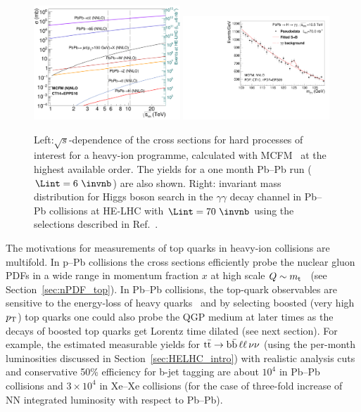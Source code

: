 \documentclass[../report.tex]{subfiles}
\begin{document}
\begin{figure}[!h]
\begin{center}
\includegraphics[width=0.49\textwidth]{helhc/figs/sigma_PbPb_pQCD_vs_sqrts.pdf}
\hfill
\includegraphics[width=0.49\textwidth]{helhc/figs/dsigmadm_Hgg_SplusB_PbPb_10500GeV_lumi70_0invpb.pdf}
\caption{Left:$\sqrt s$-dependence of the cross sections for hard processes of
  interest for a heavy-ion programme, calculated with MCFM~\cite{Campbell:2010ff}
at the highest available order. The yields for a one month Pb--Pb run ($\Lint=6~\invnb$) are also shown.
  Right: invariant mass distribution for Higgs boson search in the $\gamma\gamma$ decay channel in Pb--Pb collisions at HE-LHC with $\Lint=70~\invnb$ using the selections described in Ref.~\cite{dEnterria:2017jyt}.}
\label{fig:hardXsectHIC}
\end{center}
\end{figure}





The motivations for measurements of top quarks in heavy-ion collisions
are multifold. 
In p--Pb collisions the cross sections efficiently probe the nuclear
gluon PDFs in a wide range in momentum fraction
$x$ at high scale $Q\sim m_{\rm t}$~\cite{dEnterria:2015mgr} (see Section~\ref{sec:nPDF_top}). In Pb--Pb collisions, the top-quark observables are sensitive to the energy-loss of heavy quarks~\cite{Baskakov:2015nxa}
and by selecting boosted (very high $p_{\rm T}$) top quarks one could also probe the QGP medium at later times as the decays of boosted top quarks get Lorentz
time dilated (see next section). 
For example, the estimated measurable yields  for $\rm t\bar t\to b\bar b\,\ell\ell\,\nu\nu$ (using the
 per-month luminosities discussed in Section~\ref{sec:HELHC_intro}) with
realistic analysis cuts 
and conservative 50\% efficiency for b-jet tagging are
about $10^4$ in Pb--Pb collisions and $3\times 10^4$ in Xe--Xe collisions (for the case of three-fold increase of NN integrated luminosity with respect to Pb--Pb).
\end{document}
